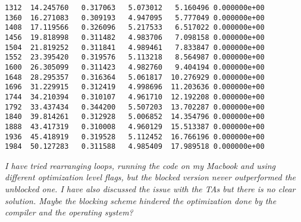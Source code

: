 \documentclass{article}
\begin{document}
\begin{enumerate}
\begin{enumerate}
\begin{verbatim}
1312  14.245760   0.317063   5.073012   5.160496 0.000000e+00
1360  16.271083   0.309193   4.947095   5.777049 0.000000e+00
1408  17.119566   0.326096   5.217533   6.517022 0.000000e+00
1456  19.818998   0.311482   4.983706   7.098158 0.000000e+00
1504  21.819252   0.311841   4.989461   7.833847 0.000000e+00
1552  23.395420   0.319576   5.113218   8.564987 0.000000e+00
1600  26.305099   0.311423   4.982760   9.404194 0.000000e+00
1648  28.295357   0.316364   5.061817  10.276929 0.000000e+00
1696  31.229915   0.312419   4.998696  11.203636 0.000000e+00
1744  34.210394   0.310107   4.961710  12.192208 0.000000e+00
1792  33.437434   0.344200   5.507203  13.702287 0.000000e+00
1840  39.814261   0.312928   5.006852  14.354796 0.000000e+00
1888  43.417319   0.310008   4.960129  15.513387 0.000000e+00
1936  45.418919   0.319528   5.112452  16.766196 0.000000e+00
1984  50.127283   0.311588   4.985409  17.989518 0.000000e+00
\end{verbatim}
\textit{I have tried rearranging loops, running the code on my Macbook and using different optimization level flags, but the blocked version never outperformed the unblocked one. I have also discussed the issue with the TAs but there is no clear solution. Maybe the blocking scheme hindered the optimization done by the compiler and the operating system? }


\end{enumerate}
\end{enumerate}
\end{document}
